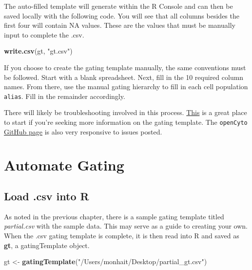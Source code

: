 \documentclass[]{book}
\newenvironment{Shaded}{\begin{snugshade}}{\end{snugshade}}
\newcommand{\KeywordTok}[1]{\textcolor[rgb]{0.13,0.29,0.53}{\textbf{#1}}}
\newcommand{\NormalTok}[1]{#1}
\newcommand{\StringTok}[1]{\textcolor[rgb]{0.31,0.60,0.02}{#1}}
\begin{document}
The auto-filled template will generate within the R Console and can then be saved locally with the following code. You will see that all columns besides the first four will contain NA values. These are the values that must be manually input to complete the .csv.

\begin{Shaded}
\begin{Highlighting}[]
\KeywordTok{write.csv}\NormalTok{(gt, }\StringTok{"gt.csv"}\NormalTok{)}
\end{Highlighting}
\end{Shaded}

If you choose to create the gating template manually, the same conventions must be followed. Start with a blank spreadsheet. Next, fill in the 10 required column names. From there, use the manual gating hierarchy to fill in each cell population \texttt{alias}. Fill in the remainder accordingly.

There will likely be troubleshooting involved in this process. \href{https://www.bioconductor.org/packages/devel/bioc/vignettes/openCyto/inst/doc/HowToWriteCSVTemplate.html\#14_gating_method_that_generates_multiple_populations}{This} is a great place to start if you're seeking more information on the gating template. The \texttt{openCyto} \href{https://github.com/RGLab/openCyto}{GitHub page} is also very responsive to issues posted.

\hypertarget{automate-gating}{%
\chapter{Automate Gating}\label{automate-gating}}

\hypertarget{load-.csv-into-r}{%
\section{Load .csv into R}\label{load-.csv-into-r}}

As noted in the previous chapter, there is a sample gating template titled \emph{partial.csv} with the sample data. This may serve as a guide to creating your own. When the .csv gating template is complete, it is then read into R and saved as \textbf{gt}, a gatingTemplate object.

\begin{Shaded}
\begin{Highlighting}[]
\NormalTok{gt <-}\StringTok{ }\KeywordTok{gatingTemplate}\NormalTok{(}\StringTok{"/Users/monhait/Desktop/partial_gt.csv"}\NormalTok{)}
\end{Highlighting}
\end{Shaded}
\end{document}
